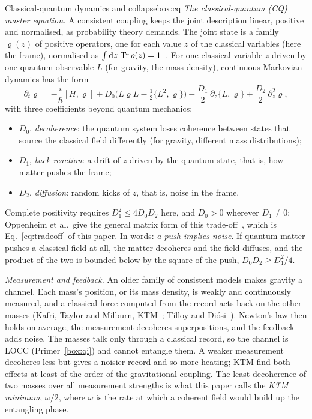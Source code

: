 \begin{primer}{Classical-quantum dynamics and collapse}{box:cq}
\setlength{\parskip}{3pt plus 1pt}%
\emph{The classical-quantum (CQ) master equation.} A consistent coupling keeps the joint description linear, positive and
normalised, as probability theory demands. The joint state is a family $\varrho(z)$ of positive operators, one for each value
$z$ of the classical variables (here the frame), normalised as $\int\mathrm{d} z\,\operatorname{Tr}\varrho(z)=1$~\cite{oppenheim}. For one classical variable
$z$ driven by one quantum observable $L$ (for gravity, the mass density), continuous Markovian dynamics has the form~\cite{osswd}
\[
\partial_t\varrho=-\frac i\hbar[H,\varrho]+D_0\Big(L\varrho L-\tfrac12\{L^2,\varrho\}\Big)-\frac{D_1}2\,\partial_z\{L,\varrho\}
+\frac{D_2}2\,\partial_z^2\varrho ,
\]
with three coefficients beyond quantum mechanics:
\begin{itemize}[nosep,leftmargin=*]
\item $D_0$, \emph{decoherence}: the quantum system loses coherence between states that source the classical field differently (for
gravity, different mass distributions);
\item $D_1$, \emph{back-reaction}: a drift of $z$ driven by the quantum state, that is, how matter pushes the frame;
\item $D_2$, \emph{diffusion}: random kicks of $z$, that is, noise in the frame.
\end{itemize}
Complete positivity requires $D_1^2\le4D_0D_2$ here, and $D_0>0$ wherever $D_1\ne0$; Oppenheim et al.\ give the general matrix form of
this trade-off~\cite[Eq.~(23)]{osswd}, which is Eq.~\eqref{eq:tradeoff} of this paper. In words: \emph{a push implies noise}. If quantum matter pushes a
classical field at all, the matter decoheres and the field diffuses, and the product of the two is bounded below by the square of the push,
$D_0D_2\ge D_1^2/4$.

\emph{Measurement and feedback.} An older family of consistent models makes gravity a channel. Each mass's position, or its mass density,
is weakly and continuously measured, and a classical force computed from the record acts back on the other masses (Kafri, Taylor and
Milburn, KTM~\cite{ktm}; Tilloy and Di\'osi~\cite{tilloydiosi}). Newton's law then holds on average, the measurement decoheres
superpositions, and the feedback adds noise. The masses talk only through a classical record, so the channel is LOCC
(Primer~\ref{box:qi}) and cannot entangle them. A weaker measurement decoheres less but gives a noisier record and so more heating; KTM find
both effects at least of the order of the gravitational coupling. The least decoherence of two masses over all measurement strengths is
what this paper calls the \emph{KTM minimum}, $\omega/2$, where $\omega$ is the rate at which a coherent field would build up the
entangling phase.


\end{primer}

